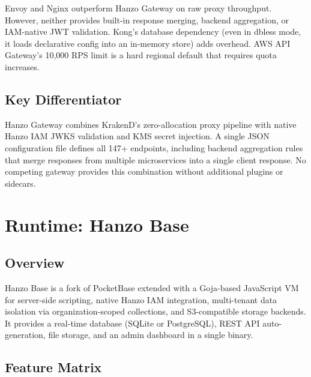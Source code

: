 \documentclass[11pt,twocolumn]{article}
\begin{document}
Envoy and Nginx outperform Hanzo Gateway on raw proxy throughput. However, neither provides built-in response merging, backend aggregation, or IAM-native JWT validation. Kong's database dependency (even in dbless mode, it loads declarative config into an in-memory store) adds overhead. AWS API Gateway's 10,000 RPS limit is a hard regional default that requires quota increases.

\subsection{Key Differentiator}

Hanzo Gateway combines KrakenD's zero-allocation proxy pipeline with native Hanzo IAM JWKS validation and KMS secret injection. A single JSON configuration file defines all 147+ endpoints, including backend aggregation rules that merge responses from multiple microservices into a single client response. No competing gateway provides this combination without additional plugins or sidecars.

\section{Runtime: Hanzo Base}
\label{sec:runtime}

\subsection{Overview}

Hanzo Base is a fork of PocketBase extended with a Goja-based JavaScript VM for server-side scripting, native Hanzo IAM integration, multi-tenant data isolation via organization-scoped collections, and S3-compatible storage backends. It provides a real-time database (SQLite or PostgreSQL), REST API auto-generation, file storage, and an admin dashboard in a single binary.

\subsection{Feature Matrix}
\end{document}
